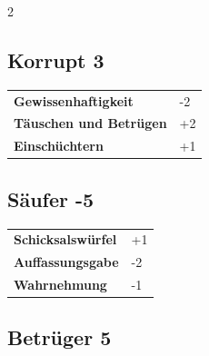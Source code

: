 \begin{multicols}{2}
\begin{tcolorbox}

\end{tcolorbox}

\begin{tcolorbox}
    \subsection*{Korrupt \hfill \small{3 }}
    \tcblower




\begin{tabular}{@{}ll@{}}
    \textbf{Gewissenhaftigkeit} & -2\\
    \textbf{Täuschen und Betrügen} & +2\\
    \textbf{Einschüchtern} & +1\\
\end{tabular}


\end{tcolorbox}

\begin{tcolorbox}
    \subsection*{Säufer \hfill \small{-5 }}
    \tcblower




\begin{tabular}{@{}ll@{}}
    \textbf{Schicksalswürfel} & +1\\
    \textbf{Auffassungsgabe} & -2\\
    \textbf{Wahrnehmung} & -1\\
\end{tabular}


\end{tcolorbox}

\begin{tcolorbox}
    \subsection*{Betrüger \hfill \small{5 }}
    \tcblower





\end{tcolorbox}
\end{multicols}
